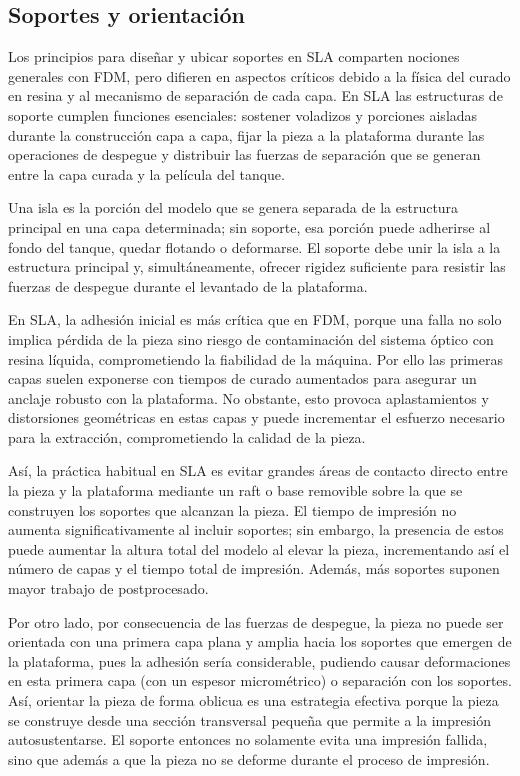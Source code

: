 \subsection{Soportes y orientación}

Los principios para diseñar y ubicar soportes en SLA comparten nociones generales con FDM, pero difieren en aspectos críticos debido a la física del curado en resina y al mecanismo de separación de cada capa. En SLA las estructuras de soporte cumplen funciones esenciales: sostener voladizos y porciones aisladas durante la construcción capa a capa, fijar la pieza a la plataforma durante las operaciones de despegue y distribuir las fuerzas de separación que se generan entre la capa curada y la película del tanque.

Una isla es la porción del modelo que se genera separada de la estructura principal en una capa determinada; sin soporte, esa porción puede adherirse al fondo del tanque, quedar flotando o deformarse. El soporte debe unir la isla a la estructura principal y, simultáneamente, ofrecer rigidez suficiente para resistir las fuerzas de despegue durante el levantado de la plataforma.

En SLA, la adhesión inicial es más crítica que en FDM, porque una falla no solo implica pérdida de la pieza sino riesgo de contaminación del sistema óptico con resina líquida, comprometiendo la fiabilidad de la máquina. Por ello las primeras capas suelen exponerse con tiempos de curado aumentados para asegurar un anclaje robusto con la plataforma. No obstante, esto provoca aplastamientos y distorsiones geométricas en estas capas y puede incrementar el esfuerzo necesario para la extracción, comprometiendo la calidad de la pieza. 

Así, la práctica habitual en SLA es evitar grandes áreas de contacto directo entre la pieza y la plataforma mediante un raft o base removible sobre la que se construyen los soportes que alcanzan la pieza. El tiempo de impresión no aumenta significativamente al incluir soportes; sin embargo, la presencia de estos puede aumentar la altura total del modelo al elevar la pieza, incrementando así el número de capas y el tiempo total de impresión. Además, más soportes suponen mayor trabajo de postprocesado.

Por otro lado, por consecuencia de las fuerzas de despegue, la pieza no puede ser orientada con una primera capa plana y amplia hacia los soportes que emergen de la plataforma, pues la adhesión sería considerable, pudiendo causar deformaciones en esta primera capa (con un espesor micrométrico) o separación con los soportes. Así, orientar la pieza de forma oblicua es una estrategia efectiva porque la pieza se construye desde una sección transversal pequeña que permite a la impresión autosustentarse. El soporte entonces no solamente evita una impresión fallida, sino que además a que la pieza no se deforme durante el proceso de impresión.

